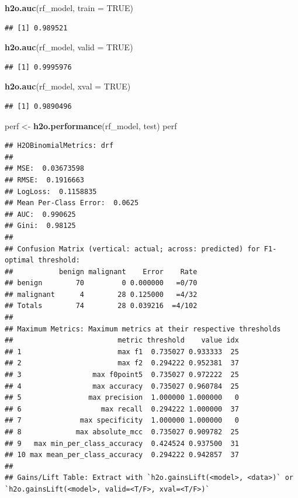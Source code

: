 \documentclass[]{article}
\newenvironment{Shaded}{\begin{snugshade}}{\end{snugshade}}
\newcommand{\KeywordTok}[1]{\textcolor[rgb]{0.13,0.29,0.53}{\textbf{{#1}}}}
\newcommand{\DataTypeTok}[1]{\textcolor[rgb]{0.13,0.29,0.53}{{#1}}}
\newcommand{\StringTok}[1]{\textcolor[rgb]{0.31,0.60,0.02}{{#1}}}
\newcommand{\OtherTok}[1]{\textcolor[rgb]{0.56,0.35,0.01}{{#1}}}
\newcommand{\NormalTok}[1]{{#1}}
\begin{document}
\begin{Shaded}
\begin{Highlighting}[]
\KeywordTok{h2o.auc}\NormalTok{(rf_model, }\DataTypeTok{train =} \OtherTok{TRUE}\NormalTok{)}
\end{Highlighting}
\end{Shaded}

\begin{verbatim}
## [1] 0.989521
\end{verbatim}

\begin{Shaded}
\begin{Highlighting}[]
\KeywordTok{h2o.auc}\NormalTok{(rf_model, }\DataTypeTok{valid =} \OtherTok{TRUE}\NormalTok{)}
\end{Highlighting}
\end{Shaded}

\begin{verbatim}
## [1] 0.9995976
\end{verbatim}

\begin{Shaded}
\begin{Highlighting}[]
\KeywordTok{h2o.auc}\NormalTok{(rf_model, }\DataTypeTok{xval =} \OtherTok{TRUE}\NormalTok{)}
\end{Highlighting}
\end{Shaded}

\begin{verbatim}
## [1] 0.9890496
\end{verbatim}

\begin{Shaded}
\begin{Highlighting}[]
\NormalTok{perf <-}\StringTok{ }\KeywordTok{h2o.performance}\NormalTok{(rf_model, test)}
\NormalTok{perf}
\end{Highlighting}
\end{Shaded}

\begin{verbatim}
## H2OBinomialMetrics: drf
## 
## MSE:  0.03673598
## RMSE:  0.1916663
## LogLoss:  0.1158835
## Mean Per-Class Error:  0.0625
## AUC:  0.990625
## Gini:  0.98125
## 
## Confusion Matrix (vertical: actual; across: predicted) for F1-optimal threshold:
##           benign malignant    Error    Rate
## benign        70         0 0.000000   =0/70
## malignant      4        28 0.125000   =4/32
## Totals        74        28 0.039216  =4/102
## 
## Maximum Metrics: Maximum metrics at their respective thresholds
##                         metric threshold    value idx
## 1                       max f1  0.735027 0.933333  25
## 2                       max f2  0.294222 0.952381  37
## 3                 max f0point5  0.735027 0.972222  25
## 4                 max accuracy  0.735027 0.960784  25
## 5                max precision  1.000000 1.000000   0
## 6                   max recall  0.294222 1.000000  37
## 7              max specificity  1.000000 1.000000   0
## 8             max absolute_mcc  0.735027 0.909782  25
## 9   max min_per_class_accuracy  0.424524 0.937500  31
## 10 max mean_per_class_accuracy  0.294222 0.942857  37
## 
## Gains/Lift Table: Extract with `h2o.gainsLift(<model>, <data>)` or `h2o.gainsLift(<model>, valid=<T/F>, xval=<T/F>)`
\end{verbatim}
\end{document}

